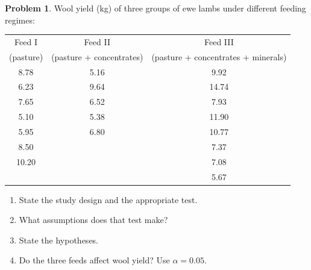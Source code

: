 \documentclass[11pt,a4paper]{article}
\theoremstyle{definition}
\newtheorem{problemx}{Problem}[section]
\newenvironment{problem}{\begin{problemx}}{\end{problemx}}
\begin{document}
\begin{problem}
Wool yield (kg) of three groups of ewe lambs under different feeding regimes:
\begin{center}
\begin{tabular}{ccc}
\hline
Feed I & Feed II & Feed III\\
(pasture) & (pasture + concentrates) & (pasture + concentrates + minerals)\\
\hline
8.78 & 5.16 & 9.92\\
6.23 & 9.64 & 14.74\\
7.65 & 6.52 & 7.93\\
5.10 & 5.38 & 11.90\\
5.95 & 6.80 & 10.77\\
8.50 &      & 7.37\\
10.20 &     & 7.08\\
      &     & 5.67\\
\hline
\end{tabular}
\end{center}
\begin{enumerate}
\item[(a).] State the study design and the appropriate test.
\item[(b).] What assumptions does that test make?
\item[(c).] State the hypotheses.
\item[(d).] Do the three feeds affect wool yield? Use $\alpha = 0.05$.
\end{enumerate}
\end{problem}
\end{document}
